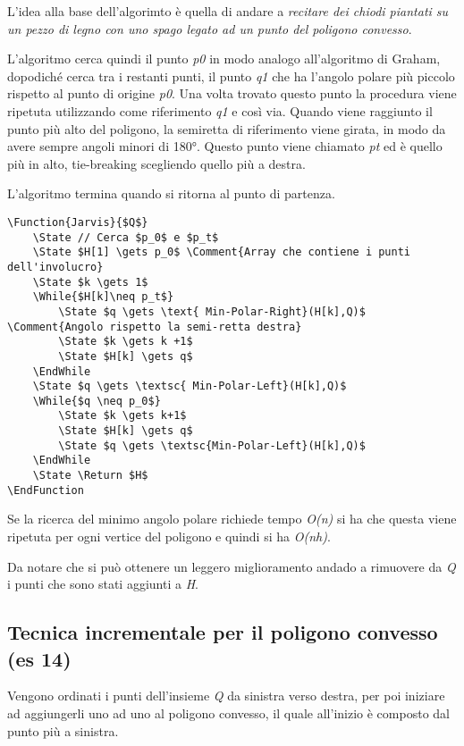 L'idea alla base dell'algorimto è quella di andare a \emph{recitare dei
chiodi piantati su un pezzo di legno con uno spago legato ad un punto
del poligono convesso}.

L'algoritmo cerca quindi il punto \emph{p0} in modo analogo
all'algoritmo di Graham, dopodiché cerca tra i restanti punti, il punto
\emph{q1} che ha l'angolo polare più piccolo rispetto al punto di
origine \emph{p0}. Una volta trovato questo punto la procedura viene
ripetuta utilizzando come riferimento \emph{q1} e così via. Quando viene
raggiunto il punto più alto del poligono, la semiretta di riferimento
viene girata, in modo da avere sempre angoli minori di 180°. Questo
punto viene chiamato \emph{pt} ed è quello più in alto, tie-breaking
scegliendo quello più a destra.

L'algoritmo termina quando si ritorna al punto di partenza.

\begin{verbatim}
\Function{Jarvis}{$Q$}
    \State // Cerca $p_0$ e $p_t$
    \State $H[1] \gets p_0$ \Comment{Array che contiene i punti dell'involucro}
    \State $k \gets 1$
    \While{$H[k]\neq p_t$}
        \State $q \gets \text{ Min-Polar-Right}(H[k],Q)$ \Comment{Angolo rispetto la semi-retta destra}
        \State $k \gets k +1$
        \State $H[k] \gets q$
    \EndWhile
    \State $q \gets \textsc{ Min-Polar-Left}(H[k],Q)$
    \While{$q \neq p_0$}
        \State $k \gets k+1$
        \State $H[k] \gets q$
        \State $q \gets \textsc{Min-Polar-Left}(H[k],Q)$
    \EndWhile
    \State \Return $H$
\EndFunction
\end{verbatim}

Se la ricerca del minimo angolo polare richiede tempo \emph{O(n)} si ha
che questa viene ripetuta per ogni vertice del poligono e quindi si ha
\emph{O(nh)}.

Da notare che si può ottenere un leggero miglioramento andado a
rimuovere da \emph{Q} i punti che sono stati aggiunti a \emph{H}.

\subsection{Tecnica incrementale per il poligono convesso (es
14)}\label{tecnica-incrementale-per-il-poligono-convesso-es-14}

Vengono ordinati i punti dell'insieme \emph{Q} da sinistra verso destra,
per poi iniziare ad aggiungerli uno ad uno al poligono convesso, il
quale all'inizio è composto dal punto più a sinistra.

